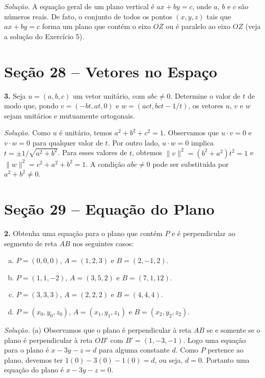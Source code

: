 \documentclass[a4paper,11pt]{article}
\begin{document}
\emph{Solução.}
A equação geral de um plano vertical é $ax + by = c$, onde $a$, $b$ e $c$ são números reais.
De fato, o conjunto de todos os pontos $(x,y,z)$ tais que $ax + by = c$ forma um plano que contém o eixo $OZ$ ou é paralelo ao eixo $OZ$ (veja a solução do Exercício 5).

\section*{Seção 28 -- Vetores no Espaço}

\textbf{3.}
Seja $u = (a, b, c)$ um vetor unitário, com $abc \neq 0$.
Determine o valor de $t$ de modo que, pondo $v = (-bt, at, 0)$ e $w = (act, bct -1/t)$, os vetores $u$, $v$ e $w$ sejam unitários e mutuamente ortogonais.

\vspace{\baselineskip}

\emph{Solução.}
Como $u$ é unitário, temos $a^2 + b^2 + c^2 = 1$.
Observamos que $u \cdot v = 0$ e $v \cdot w = 0$ para qualquer valor de $t$.
Por outro lado, $u \cdot w = 0$ implica $t = \pm 1/\sqrt{a^2 + b^2}$.
Para esses valores de $t$, obtemos $\| v \|^2 = (b^2 + a^2)t^2 = 1$ e $\| w \|^2 = c^2 + a^2 + b^2 = 1$.
A condição $abc \neq 0$ pode ser substituída por $a^2 + b^2 \neq 0$.

\section*{Seção 29 -- Equação do Plano}

\textbf{2.}
Obtenha uma equação para o plano que contém $P$ e é perpendicular ao segmento de reta $AB$ nos seguintes casos:
\begin{enumerate}[(a)]
  \item
    $P = (0,0,0)$, $A = (1,2,3)$ e $B = (2,-1,2)$.
  \item
    $P = (1,1,-2)$, $A = (3,5,2)$ e $B = (7,1,12)$.
  \item
    $P = (3,3,3)$, $A = (2,2,2)$ e $B = (4,4,4)$.
  \item
    $P = (x_0, y_0, z_0)$, $A = (x_1,y_1,z_1)$ e $B = (x_2,y_2,z_2)$.
\end{enumerate}

\vspace{\baselineskip}

\emph{Solução.}
(a)
Observamos que o plano é perpendicular à reta $AB$ se e somente se o plano é perpendicular à reta $OB'$ com $B' = (1,-3,-1)$.
Logo uma equação para o plano é $x - 3y - z = d$ para alguma constante $d$.
Como $P$ pertence ao plano, devemos ter $1(0) - 3(0) -1(0) = d$, ou seja, $d=0$.
Portanto uma equação do plano é $x - 3y - z = 0$.
\end{document}
